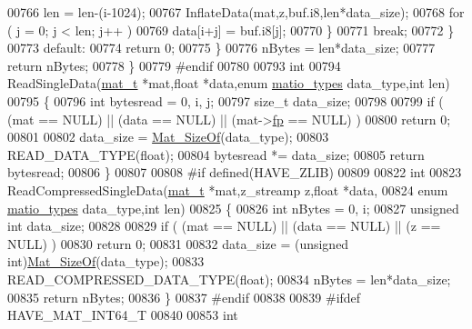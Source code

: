 \begin{DoxyCode}
00766                 len = len-(i-1024);
00767                 InflateData(mat,z,buf.i8,len*data\_size);
00768                 \textcolor{keywordflow}{for} ( j = 0; j < len; j++ )
00769                     data[i+j] = buf.i8[j];
00770             \}
00771             \textcolor{keywordflow}{break};
00772         \}
00773         \textcolor{keywordflow}{default}:
00774             \textcolor{keywordflow}{return} 0;
00775     \}
00776     nBytes = len*data\_size;
00777     \textcolor{keywordflow}{return} nBytes;
00778 \}
00779 \textcolor{preprocessor}{#endif}
00780 
00793 \textcolor{keywordtype}{int}
00794 ReadSingleData(\hyperlink{struct__mat__t}{mat\_t} *mat,\textcolor{keywordtype}{float} *data,\textcolor{keyword}{enum} \hyperlink{group___m_a_t_gacf7b3b879282b7ab3a51190e49bf3453}{matio\_types} data\_type,\textcolor{keywordtype}{int} len)
00795 \{
00796     \textcolor{keywordtype}{int} bytesread = 0, i, j;
00797     \textcolor{keywordtype}{size\_t} data\_size;
00798 
00799     \textcolor{keywordflow}{if} ( (mat == NULL) || (data == NULL) || (mat->\hyperlink{struct__mat__t_a85f562e407ca9ad4d2a6e14f839432b7}{fp} == NULL) )
00800         \textcolor{keywordflow}{return} 0;
00801 
00802     data\_size = \hyperlink{group__mat__util_gab6774aabdc124c540c1e7686d0804940}{Mat\_SizeOf}(data\_type);
00803     READ\_DATA\_TYPE(\textcolor{keywordtype}{float});
00804     bytesread *= data\_size;
00805     \textcolor{keywordflow}{return} bytesread;
00806 \}
00807 
00808 \textcolor{preprocessor}{#if defined(HAVE\_ZLIB)}
00809 
00822 \textcolor{keywordtype}{int}
00823 ReadCompressedSingleData(\hyperlink{struct__mat__t}{mat\_t} *mat,z\_streamp z,\textcolor{keywordtype}{float} *data,
00824     \textcolor{keyword}{enum} \hyperlink{group___m_a_t_gacf7b3b879282b7ab3a51190e49bf3453}{matio\_types} data\_type,\textcolor{keywordtype}{int} len)
00825 \{
00826     \textcolor{keywordtype}{int} nBytes = 0, i;
00827     \textcolor{keywordtype}{unsigned} \textcolor{keywordtype}{int} data\_size;
00828 
00829     \textcolor{keywordflow}{if} ( (mat == NULL) || (data == NULL) || (z == NULL) )
00830         \textcolor{keywordflow}{return} 0;
00831 
00832     data\_size = (\textcolor{keywordtype}{unsigned} int)\hyperlink{group__mat__util_gab6774aabdc124c540c1e7686d0804940}{Mat\_SizeOf}(data\_type);
00833     READ\_COMPRESSED\_DATA\_TYPE(\textcolor{keywordtype}{float});
00834     nBytes = len*data\_size;
00835     \textcolor{keywordflow}{return} nBytes;
00836 \}
00837 \textcolor{preprocessor}{#endif}
00838 
00839 \textcolor{preprocessor}{#ifdef HAVE\_MAT\_INT64\_T}
00840 
00853 \textcolor{keywordtype}{int}

\end{DoxyCode}
